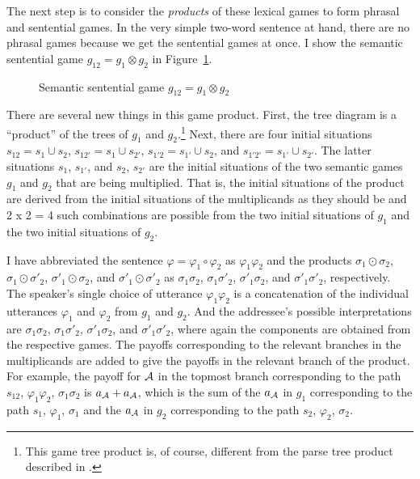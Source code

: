 The next step is to consider the \emph{products} of these lexical games to form phrasal and sentential games. In the very simple two-word sentence at hand, there are no phrasal games because we get the sentential games at once. I show the semantic sentential game $g_{12} = g_1 \otimes g_2$ in Figure~\ref{fig:semantic sentential game g12}.

\begin{figure}[p] 

\caption{Semantic sentential game $g_{12} = g_1 \otimes g_2$}
\label{fig:semantic sentential game g12}
\end{figure}

There are several new things in this game product. First, the tree diagram is a ``product'' of the trees of $g_1$ and $g_2$.\footnote{This game tree product is, of course, different from the parse tree product described in .} Next, there are four initial situations $s_{12} = s_1 \cup s_2$, $s_{12'} = s_1 \cup s_{2'}$, $s_{1'2} = s_{1'} \cup s_{2}$, and $s_{1'2'} = s_{1'} \cup s_{2'}$. The latter situations $s_1$, $s_{1'}$, and $s_2$, $s_{2'}$ are the initial situations of the two semantic games $g_1$ and $g_2$ that are being multiplied. That is, the initial situations of the product are derived from the initial situations of the multiplicands as they should be and 2 x 2 = 4 such combinations are possible from the two initial situations of $g_1$ and the two initial situations of $g_2$.

I have abbreviated the sentence $\varphi = \varphi_1 \circ \varphi_2$ as $\varphi_1\varphi_2$ and the products $\sigma_1 \odot \sigma_2$, $\sigma_1 \odot \sigma'_2$, $\sigma'_1 \odot \sigma_2$, and $\sigma'_1 \odot \sigma'_2$ as $\sigma_1\sigma_2$, $\sigma_1\sigma'_2$, $\sigma'_1\sigma_2$, and $\sigma'_1\sigma'_2$, respectively. The speaker's single choice of utterance $\varphi_1\varphi_2$ is a concatenation of the individual utterances $\varphi_1$ and $\varphi_2$ from $g_1$ and $g_2$. And the addressee's possible interpretations are $\sigma_1\sigma_2$, $\sigma_1\sigma'_2$, $\sigma'_1\sigma_2$, and $\sigma'_1\sigma'_2$, where again the components are obtained from the respective games. The payoffs corresponding to the relevant branches in the multiplicands are added to give the payoffs in the relevant branch of the product. For example, the payoff for $\cal A$ in the topmost branch corresponding to the path $s_{12}$, $\varphi_1\varphi_2$, $\sigma_1\sigma_2$ is $a_{\cal A} + a_{\cal A}$, which is the sum of the $a_{\cal A}$ in $g_1$ corresponding to the path $s_1$, $\varphi_1$, $\sigma_1$ and the $a_{\cal A}$ in $g_2$ corresponding to the path $s_2$, $\varphi_2$, $\sigma_2$.

